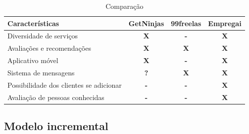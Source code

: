 \begin{table}[htb]
    \centering
    \caption{Comparação}
    \label{tab:comparação}
\begin{tabular}{|p{5cm}|p{2cm}|p{2cm}|p{2cm}|}
    \hline
    \textbf{Características} & \textbf{GetNinjas} & \textbf{99freelas} & \textbf{Empregai}  \\ \hline
    Diversidade de serviços   & \multicolumn{1}{c|}{\textbf{X}}   & \multicolumn{1}{c|}{\textbf{-}}  & \multicolumn{1}{c|}{\textbf{X}} \\ \hline
	Avaliações e recomendações   & \multicolumn{1}{c|}{\textbf{X}}   & \multicolumn{1}{c|}{\textbf{X}}  & \multicolumn{1}{c|}{\textbf{X}} \\ \hline
    Aplicativo móvel   & \multicolumn{1}{c|}{\textbf{X}}   & \multicolumn{1}{c|}{\textbf{-}}  & \multicolumn{1}{c|}{\textbf{X}} \\ \hline
    Sistema de mensagens   & \multicolumn{1}{c|}{\textbf{?}}   & \multicolumn{1}{c|}{\textbf{X}}  & \multicolumn{1}{c|}{\textbf{X }} \\ \hline
    Possibilidade dos clientes se adicionar   & \multicolumn{1}{c|}{\textbf{-}}   & \multicolumn{1}{c|}{\textbf{-}}  & \multicolumn{1}{c|}{\textbf{X}} \\ \hline
	Avaliação de pessoas conhecidas   & \multicolumn{1}{c|}{\textbf{-}}   & \multicolumn{1}{c|}{\textbf{-}}  & \multicolumn{1}{c|}{\textbf{X}} \\ \hline
\end{tabular}
\end{table}

\subsection{Modelo incremental}

